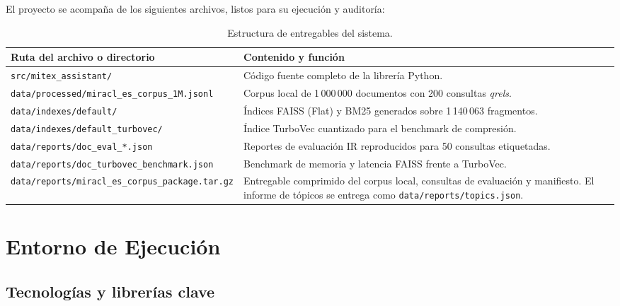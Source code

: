 \documentclass[11pt,a4paper]{article}
\newcommand{\code}[1]{\texttt{#1}}
\begin{document}
El proyecto se acompaña de los siguientes archivos, listos para su ejecución y auditoría:

\begin{table}[htbp]
\centering
\small
{}
\begin{tabularx}{\textwidth}{l X}
\toprule
\rowcolor{tabheader} \textbf{Ruta del archivo o directorio} & \textbf{Contenido y función} \\
\midrule
\code{src/mitex\_assistant/} & Código fuente completo de la librería Python. \\
\code{data/processed/miracl\_es\_corpus\_1M.jsonl} & Corpus local de 1\,000\,000 documentos con 200 consultas \textit{qrels}. \\
\code{data/indexes/default/} & Índices FAISS (Flat) y BM25 generados sobre 1\,140\,063 fragmentos. \\
\code{data/indexes/default\_turbovec/} & Índice TurboVec cuantizado para el benchmark de compresión. \\
\code{data/reports/doc\_eval\_*.json} & Reportes de evaluación IR reproducidos para 50 consultas etiquetadas. \\
\code{data/reports/doc\_turbovec\_benchmark.json} & Benchmark de memoria y latencia FAISS frente a TurboVec. \\
\code{data/reports/miracl\_es\_corpus\_package.tar.gz} & Entregable comprimido del corpus local, consultas de evaluación y manifiesto. El informe de tópicos se entrega como \code{data/reports/topics.json}. \\
\bottomrule
\end{tabularx}
\caption{Estructura de entregables del sistema.}
\end{table}

\FloatBarrier

\section{Entorno de Ejecución}

\subsection{Tecnologías y librerías clave}
\end{document}
